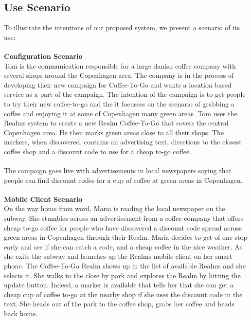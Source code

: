 \subsection{Use Scenario} %
\label{sub:scenario}
To illustrate the intentions of our proposed system, we present a scenario of its use:
\\\\
\textbf{Configuration Scenario}\\
Tom is the communication responsible for a large danish coffee company with several shops around the Copenhagen area. The company is in the process of developing their new campaign for Coffee-To-Go and wants a location based service as a part of the campaign. The intention of the campaign is to get people to try their new coffee-to-go and the it focusses on the scenario of grabbing a coffee and enjoying it at some of Copenhagen many green areas. Tom uses the Realms system to create a new Realm Coffee-To-Go that covers the central Copenhagen area. He then marks green areas close to all their shops. The markers, when discovered, contains an advertising text, directions to the closest coffee shop and a discount code to use for a cheap to-go coffee.
\\\\
The campaign goes live with advertisements in local newspapers saying that people can find discount codes for a cup of coffee at green areas in Copenhagen. 
\\\\
\textbf{Mobile Client Scenario}\\
On the way home from word, Maria is reading the local newspaper on the subway. She stumbles across an advertisement from a coffee company that offers cheap to-go coffee for people who have discovered a discount code spread across green areas in Copenhagen through their Realm. Maria decides to get of one stop early and see if she can catch a code, and a cheap coffee in the nice weather. As she exits the subway and launches up the Realms mobile client on her smart phone. The Coffee-To-Go Realm shows up in the list of available Realms and she selects it. She walks to the close by park and explores the Realm by hitting the update button. Indeed, a marker is available that tells her that she can get a cheap cup of coffee to-go at the nearby shop if she uses the discount code in the text. She heads out of the park to the coffee shop, grabs her coffee and heads back home.


